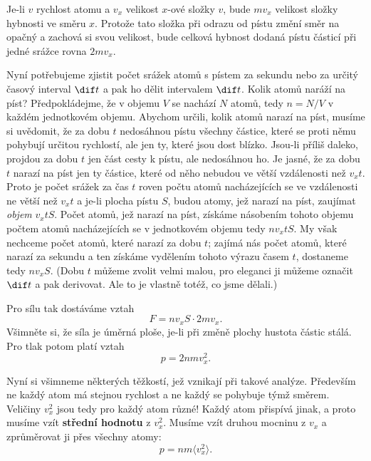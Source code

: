     Je-li \(v\) rychlost atomu a \(v_x\) velikost \(x\)-ové složky \(v\), bude \(mv_x\) velikost
    složky hybnosti ve směru \(x\). Protože tato složka při odrazu od pístu změní směr na opačný a
    zachová si svou velikost, bude celková hybnost dodaná pístu částicí při jedné srážce rovna
    \(2mv_x\).

    Nyní potřebujeme zjistit počet srážek atomů s pístem za sekundu nebo za určitý časový interval
    \(\dif t\) a pak ho dělit intervalem \(\dif t\). Kolik atomů naráží na píst? Předpokládejme, že
    v objemu \(V\) se nachází \(N\) atomů, tedy \(n = N/V\) v každém jednotkovém objemu. Abychom
    určili, kolik atomů narazí na píst, musíme si uvědomit, že za dobu \(t\) nedosáhnou pístu
    všechny částice, které se proti němu pohybují určitou rychlostí, ale jen ty, které jsou dost
    blízko. Jsou-li příliš daleko, projdou za dobu \(t\) jen část cesty k pístu, ale nedosáhnou ho.
    Je jasné, že za dobu \(t\) narazí na píst jen ty částice, které od něho nebudou ve větší
    vzdálenosti než \(v_xt\). Proto je počet srážek za čas \(t\) roven počtu atomů nacházejících se
    ve vzdálenosti ne větší než \(v_xt\) a je-li plocha pístu \(S\), budou atomy, jež narazí na
    píst, zaujímat \emph{objem} \(v_xtS\). Počet atomů, jež narazí na píst, získáme násobením tohoto
    objemu počtem atomů nacházejících se v jednotkovém objemu tedy \(nv_xtS\). My však nechceme
    počet atomů, které narazí za dobu \(t\); zajímá nás počet atomů, které narazí za sekundu a ten
    získáme vydělením tohoto výrazu časem \(t\), dostaneme tedy \(nv_xS\). (Dobu \(t\) můžeme zvolit
    velmi malou, pro eleganci ji můžeme označit \(\dif t\) a pak derivovat. Ale to je vlastně totéž,
    co jsme dělali.)

    Pro sílu tak dostáváme vztah
    \begin{equation}\label{fyz:eq614}
      F=nv_xS\cdot2mv_x.
    \end{equation}
    Všimněte si, že síla je úměrná ploše, je-li při změně plochy hustota částic stálá. Pro tlak
    potom platí vztah
    \begin{equation}\label{fyz:eq615}
      p=2nmv^2_x.
    \end{equation}
   
    Nyní si všimneme některých těžkostí, jež vznikají při takové analýze. Především ne každý atom má
    stejnou rychlost a ne každý se pohybuje týmž směrem. Veličiny \(v_x^2\) jsou tedy pro každý atom
    různé! Každý atom přispívá jinak, a proto musíme vzít \textbf{střední hodnotu} z \(v_x^2\).
    Musíme vzít druhou mocninu z \(v_x\) a zprůměrovat ji přes všechny atomy:
    \begin{equation}\label{fyz:eq616}
      p=nm\langle v^2_x\rangle.
    \end{equation}

